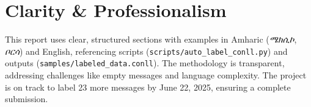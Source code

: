\documentclass[11pt]{article}
\begin{document}
\section*{Clarity \& Professionalism}
This report uses clear, structured sections with examples in Amharic (\textit{ሜክሲኮ}, \textit{ቦርሳ}) and English, referencing scripts (\texttt{scripts/auto\_label\_conll.py}) and outputs (\texttt{samples/labeled\_data.conll}). The methodology is transparent, addressing challenges like empty messages and language complexity. The project is on track to label 23 more messages by June 22, 2025, ensuring a complete submission.
\end{document}
